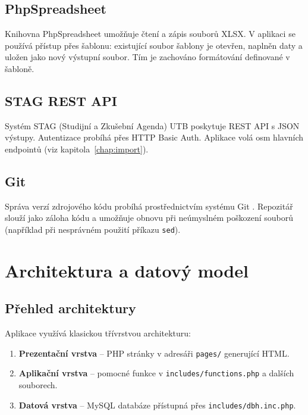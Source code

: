 \documentclass[12pt,a4paper]{report}
\begin{document}
\section{PhpSpreadsheet}

Knihovna PhpSpreadsheet \cite{phpspreadsheet} umožňuje čtení a zápis souborů XLSX. V aplikaci se používá přístup přes šablonu: existující soubor šablony je otevřen, naplněn daty a uložen jako nový výstupní soubor. Tím je zachováno formátování definované v šabloně.

\section{STAG REST API}

Systém STAG (Studijní a Zkušební Agenda) \cite{stagapi} UTB poskytuje REST API s JSON výstupy. Autentizace probíhá přes HTTP Basic Auth. Aplikace volá osm hlavních endpointů (viz kapitola~\ref{chap:import}).

\section{Git}

Správa verzí zdrojového kódu probíhá prostřednictvím systému Git \cite{git}. Repozitář slouží jako záloha kódu a umožňuje obnovu při neúmyslném poškození souborů (například při nesprávném použití příkazu \texttt{sed}).

\chapter{Architektura a datový model}

\section{Přehled architektury}

Aplikace využívá klasickou třívrstvou architekturu:
\begin{enumerate}
  \item \textbf{Prezentační vrstva} -- PHP stránky v adresáři \texttt{pages/} generující HTML.
  \item \textbf{Aplikační vrstva} -- pomocné funkce v \texttt{includes/functions.php} a dalších souborech.
  \item \textbf{Datová vrstva} -- MySQL databáze přístupná přes \texttt{includes/dbh.inc.php}.
\end{enumerate}
\end{document}
